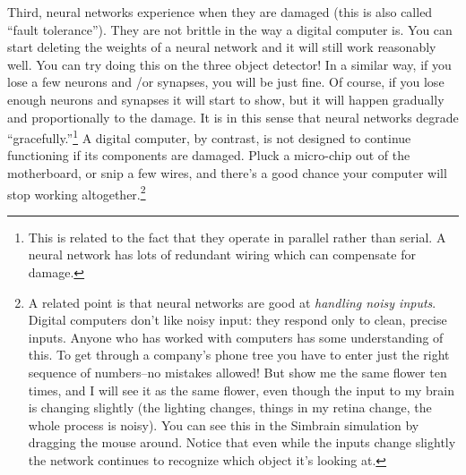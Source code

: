 Third, neural networks experience  when they are damaged (this is also called ``fault tolerance''). They are not brittle in the way a digital computer is. You can start deleting the weights of a neural network and it will still work reasonably well. You can try doing this on the three object detector!   In a  similar way, if you lose a few neurons and /or synapses, you will be just fine. Of course, if you lose enough neurons and synapses it will start to show, but it will happen gradually and  proportionally to the damage. It is in this sense that neural networks degrade ``gracefully.''\footnote{This is related to the fact that they operate in parallel rather than serial. A neural network has lots of redundant wiring which can compensate for damage.}  A digital computer, by contrast, is not designed to continue functioning if its components are damaged. Pluck a micro-chip out of the motherboard, or snip a few wires, and there's a good chance your computer will stop working altogether.\footnote{A related point is that neural networks are good at \emph{handling noisy inputs}. Digital computers don't like noisy input: they respond only to clean, precise inputs. Anyone who has worked with computers has some understanding of this. To get through a company's phone tree you have to enter just the right sequence of numbers--no mistakes allowed!  But show me the same flower ten times, and I will see it as the same flower, even though the input to my brain is changing slightly (the lighting changes, things in my retina change, the whole process is noisy). You can see this in the Simbrain simulation by dragging the mouse around. Notice that even while the inputs change slightly the network continues to recognize which object it's looking at.}

